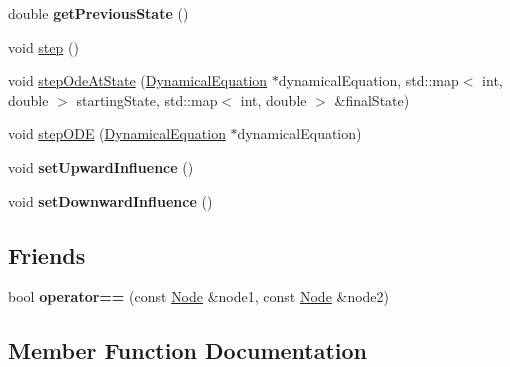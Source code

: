 \begin{DoxyCompactItemize}
\item 
double {\bfseries get\+Previous\+State} ()\hypertarget{classNode_a6aa927856c01c3e3849fb79db03a4232}{}\label{classNode_a6aa927856c01c3e3849fb79db03a4232}

\item 
void \hyperlink{classNode_aeca7ef58472c76e9e751226abc2f6454}{step} ()
\item 
void \hyperlink{classNode_aeb2d389fbdfff8a2b4df8da2293b0e0d}{step\+Ode\+At\+State} (\hyperlink{classDynamicalEquation}{Dynamical\+Equation} $\ast$dynamical\+Equation, std\+::map$<$ int, double $>$ starting\+State, std\+::map$<$ int, double $>$ \&final\+State)
\item 
void \hyperlink{classNode_afe30b7fc1388bb03bf2db231cc1c8656}{step\+O\+DE} (\hyperlink{classDynamicalEquation}{Dynamical\+Equation} $\ast$dynamical\+Equation)
\item 
void {\bfseries set\+Upward\+Influence} ()\hypertarget{classNode_a905952508ade253c1e8c826ce4ab5434}{}\label{classNode_a905952508ade253c1e8c826ce4ab5434}

\item 
void {\bfseries set\+Downward\+Influence} ()\hypertarget{classNode_acf0d5159faf93928dbfbe654feedd9a4}{}\label{classNode_acf0d5159faf93928dbfbe654feedd9a4}

\end{DoxyCompactItemize}
\subsection*{Friends}
\begin{DoxyCompactItemize}
\item 
bool {\bfseries operator==} (const \hyperlink{classNode}{Node} \&node1, const \hyperlink{classNode}{Node} \&node2)\hypertarget{classNode_aa6ca4e78d2001f10e20ffcf962ef42cb}{}\label{classNode_aa6ca4e78d2001f10e20ffcf962ef42cb}

\end{DoxyCompactItemize}


\subsection{Member Function Documentation}
